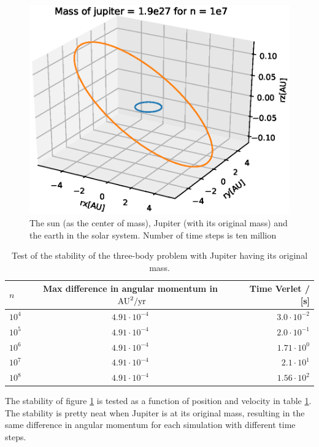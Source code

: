 \documentclass{article}
\begin{document}
\begin{figure}[H]
  \includegraphics[scale=0.5]{plots/Mass1.eps}
  \caption{The sun (as the center of mass), Jupiter (with its original mass) and the earth in the solar system. Number of time steps is ten million}
  \label{jupitermass1}
\end{figure}

\begin{table}[H]
    \centering
    \begin{tabular}{|l|c|r|}
    \hline
     $n$ & Max difference in angular momentum in ${\textnormal{ AU}}^2\textnormal{/yr}$ & Time Verlet / [s] \\
     \hline
      $10^4$  & $4.91\cdot10^{-4}$  & $3.0\cdot10^{-2}$\\
      $10^5$  & $4.91\cdot10^{-4}$  & $2.0\cdot10^{-1}$ \\
      $10^6$  & $4.91\cdot10^{-4}$  & $1.71\cdot10^{0}$\\
      $10^7$  & $4.91\cdot10^{-4}$  & $2.1\cdot10^{1}$\\
      $10^8$  & $4.91\cdot10^{-4}$  & $1.56\cdot10^{2}$\\
      \hline
    \end{tabular}
    \caption{Test of the stability of the three-body problem with Jupiter having its original mass.}
    \label{Three-body-problem}
\end{table}

The stability of figure \ref{jupitermass1} is tested as a function of position and velocity in table \ref{Three-body-problem}. The stability is pretty neat when Jupiter is at its original mass, resulting in the same difference in angular momentum for each simulation with different time steps.
\end{document}
